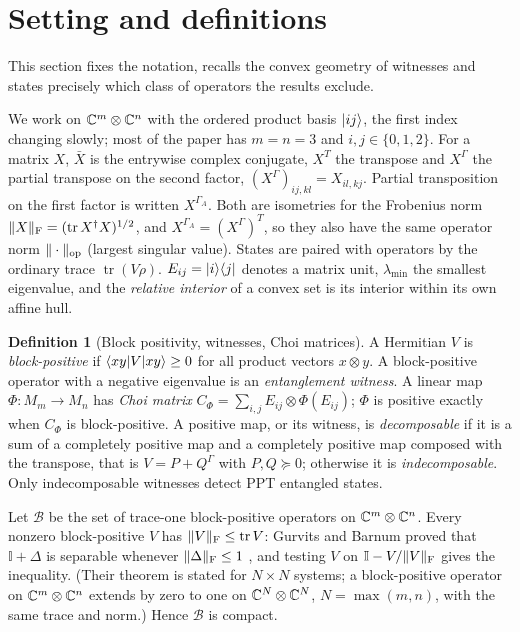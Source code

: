 \documentclass[11pt,a4paper]{article}
\theoremstyle{definition}\newtheorem{definition}[theorem]{Definition}\newtheorem*{conj}{Conjecture 9 of Shen, Chen and Bian}\newtheorem{remark}[theorem]{Remark}
\newcommand{\tr}{\operatorname{tr}}\newcommand{\im}{\operatorname{Im}}\newcommand{\adj}{\operatorname{adj}}\newcommand{\id}{\mathbb I}
\newcommand{\cB}{\mathcal B}\newcommand{\cR}{\mathcal R}\newcommand{\vecm}{\mathrm{vec}}
\begin{document}
\section{Setting and definitions}\label{sec:setting}
This section fixes the notation, recalls the convex geometry of witnesses and states precisely which class of operators the results exclude.

We work on $\mathbb C^m\otimes\mathbb C^n$ with the ordered product basis $\lvert ij\rangle$, the first index changing slowly; most of the paper has $m=n=3$ and $i,j\in\{0,1,2\}$. For a matrix $X$, $\bar X$ is the entrywise complex conjugate, $X^T$ the transpose and $X^\Gamma$ the partial transpose on the second factor, $(X^\Gamma)_{ij,kl}=X_{il,kj}$. Partial transposition on the first factor is written $X^{\Gamma_A}$. Both are isometries for the Frobenius norm $\|X\|_\F=(\tr X^\dagger X)^{1/2}$, and $X^{\Gamma_A}=(X^\Gamma)^T$, so they also have the same operator norm $\|\cdot\|_{\mathrm{op}}$ (largest singular value). States are paired with operators by the ordinary trace $\tr(V\rho)$. $E_{ij}=\lvert i\rangle\langle j\rvert$ denotes a matrix unit, $\lambda_{\min}$ the smallest eigenvalue, and the \emph{relative interior} of a convex set is its interior within its own affine hull.

\begin{definition}[Block positivity, witnesses, Choi matrices]
A Hermitian $V$ is \emph{block-positive} if $\langle xy\rvert V\lvert xy\rangle\geq0$ for all product vectors $x\otimes y$. A block-positive operator with a negative eigenvalue is an \emph{entanglement witness}. A linear map $\Phi:M_m\to M_n$ has \emph{Choi matrix} $C_\Phi=\sum_{i,j}E_{ij}\otimes\Phi(E_{ij})$; $\Phi$ is positive exactly when $C_\Phi$ is block-positive. A positive map, or its witness, is \emph{decomposable} if it is a sum of a completely positive map and a completely positive map composed with the transpose, that is $V=P+Q^\Gamma$ with $P,Q\succeq0$; otherwise it is \emph{indecomposable}. Only indecomposable witnesses detect PPT entangled states.
\end{definition}

Let $\cB$ be the set of trace-one block-positive operators on $\mathbb C^m\otimes\mathbb C^n$. Every nonzero block-positive $V$ has $\|V\|_\F\leq\tr V$: Gurvits and Barnum proved that $\id+\Delta$ is separable whenever $\|\Delta\|_\mathrm F\leq1$ \cite[Theorem 1]{gurvits}, and testing $V$ on $\id-V/\|V\|_\F$ gives the inequality. (Their theorem is stated for $N\times N$ systems; a block-positive operator on $\mathbb C^m\otimes\mathbb C^n$ extends by zero to one on $\mathbb C^N\otimes\mathbb C^N$, $N=\max(m,n)$, with the same trace and norm.) Hence $\cB$ is compact.
\end{document}
